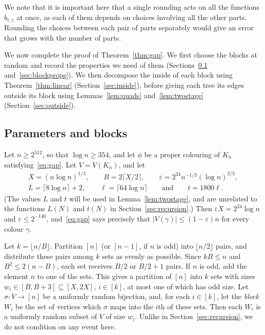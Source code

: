 We note that it is important here that a single rounding acts on all the functions $b_{i,\gamma}$ at once, as each of them depends on choices involving all the other parts. Rounding the choices between each pair of parts separately would give an error that grows with the number of parts.

We now complete the proof of Theorem~\ref{thm:gap}.
We first choose the blocks at random and record the properties we need of them (Sections~\ref{sec:blocks} and~\ref{sec:blockprops}). We then decompose the inside of each block using Theorem~\ref{thm:linear} (Section~\ref{sec:inside}), before giving each tree its edges outside its block using Lemmas~\ref{lem:quads} and~\ref{lem:twostage} (Section~\ref{sec:outside}).

\subsection{Parameters and blocks}\label{sec:blocks}
Let $n\ge2^{512}$, so that $\log n\ge354$, and let $\phi$ be a proper colouring of $K_n$ satisfying~\eqref{eq:gap}. Let $V=V(K_n)$, and let
\begin{gather*}X=(n\log n)^{1/3},\qquad B=2\lceil X/2\rceil,\qquad\varepsilon=2^{24}n^{-1/3}(\log n)^{2/3},\\ L=\lceil8\log n\rceil+2,\qquad \ell=\lceil64\log n\rceil\qquad\text{and}\qquad t=1800\ell.\end{gather*}
(The values $L$ and $t$ will be used in Lemma~\ref{lem:twostage}, and are unrelated to the functions $L(N)$ and $t(N)$ in Section~\ref{sec:recursion}.)
Then $\varepsilon X=2^{24}\log n$ and $\varepsilon\le2^{-140}$, and~\eqref{eq:gap} says precisely that $|V(\gamma)|\le(1-\varepsilon)n$ for every colour $\gamma$.

Let $k=\lfloor n/B\rfloor$. Partition $[n]$ (or $[n-1]$, if $n$ is odd) into $\lfloor n/2\rfloor$ pairs, and distribute these pairs among $k$ sets as evenly as possible. Since $kB\le n$ and $B^2\le 2(n-B)$, each set receives $B/2$ or $B/2+1$ pairs. If $n$ is odd, add the element $n$ to one of the sets. This gives a partition of $[n]$ into $k$ sets with sizes $w_i\in[B,B+3]\subseteq[X,2X]$, $i\in [k]$, at most one of which has odd size.
Let $\sigma:V\to[n]$ be a uniformly random bijection, and, for each $i\in [k]$, let the \emph{block} $W_i$ be the set of vertices which $\sigma$ maps into the $i$th of these sets. Then each $W_i$ is a uniformly random subset of $V$ of size $w_i$.
Unlike in Section~\ref{sec:recursion}, we do not condition on any event here.

